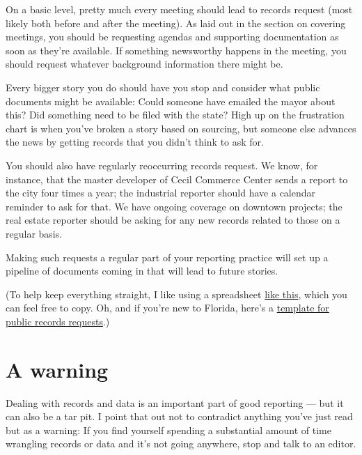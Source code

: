 \documentclass[
  11pt,
  american,
  letterpaperpaper,
  extrafontsizes,onecolumn,openright
  ]{memoir}
\begin{document}
On a basic level, pretty much every meeting should lead to records request (most likely both before and after the meeting). As laid out in the section on covering meetings, you should be requesting agendas and supporting documentation as soon as they're available. If something newsworthy happens in the meeting, you should request whatever background information there might be.

Every bigger story you do should have you stop and consider what public documents might be available: Could someone have emailed the mayor about this? Did something need to be filed with the state? High up on the frustration chart is when you've broken a story based on sourcing, but someone else advances the news by getting records that you didn't think to ask for.

You should also have regularly reoccurring records request. We know, for instance, that the master developer of Cecil Commerce Center sends a report to the city four times a year; the industrial reporter should have a calendar reminder to ask for that. We have ongoing coverage on downtown projects; the real estate reporter should be asking for any new records related to those on a regular basis.

Making such requests a regular part of your reporting practice will set up a pipeline of documents coming in that will lead to future stories.

(To help keep everything straight, I like using a spreadsheet \href{https://acbj-my.sharepoint.com/:x:/g/personal/tgibbons_bizjournals_com/Ea65ng1GEW9OqWxEPRx1TzkBMyipS5wkbaYueyRBy6mmkw?e=NFxJmG}{like this}, which you can feel free to copy. Oh, and if you're new to Florida, here's a \href{https://acbj-my.sharepoint.com/:w:/g/personal/tgibbons_bizjournals_com/EfD3WnLQ15tHl5L4WWqUNpcBazng7XTyUZ-0wdpofYVfyQ?e=xzp1Bf}{template for public records requests}.)

\hypertarget{a-warning}{%
\section*{A warning}\label{a-warning}}

Dealing with records and data is an important part of good reporting --- but it can also be a tar pit. I point that out not to contradict anything you've just read but as a warning: If you find yourself spending a substantial amount of time wrangling records or data and it's not going anywhere, stop and talk to an editor.
\end{document}
